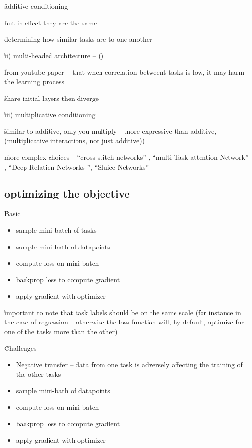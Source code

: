 \r{additive conditioning}


\r{but in effect they are the same}

\r{determining how similar tasks are to one another}

\r{ii) multi-headed architecture -- ()}

\r{from youtube paper -- that when correlation betweent tasks is low, it may harm the learning process}

\r{share initial layers then diverge}

\r{iii) multiplicative conditioning}

\r{similar to additive, only you multiply -- more expressive than additive, (multiplicative interactions, not just additive))}

\r{more complex choices -- ``cross stitch networks'' , ``multi-Task attention Network'' , ``Deep Relation Networks '', ``Sluice Networks'' }

\subsection{optimizing the objective}

\r{Basic}
\begin{itemize}[noitemsep,topsep=0pt]
	\item sample mini-batch of tasks
	\item sample mini-bath of datapoints
	\item compute loss on mini-batch
	\item backprop loss to compute gradient
	\item apply gradient with optimizer
\end{itemize}

\r{important to note that task labels should be on the same scale (for instance in the case of regression -- otherwise the loss function will, by default, optimize for one of the tasks more than the other)}

\r{Challenges}
\begin{itemize}[noitemsep,topsep=0pt]
	\item Negative transfer -- data from one task is adversely affecting the training of the other tasks
	\item sample mini-bath of datapoints
	\item compute loss on mini-batch
	\item backprop loss to compute gradient
	\item apply gradient with optimizer
\end{itemize}

